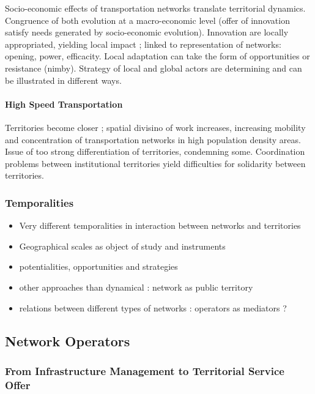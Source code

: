 Socio-economic effects of transportation networks translate territorial dynamics. Congruence of both evolution at a macro-economic level (offer of innovation satisfy needs generated by socio-economic evolution). Innovation are locally appropriated, yielding local impact ; linked to representation of networks: opening, power, efficacity. Local adaptation can take the form of opportunities or resistance (nimby). Strategy of local and global actors are determining and can be illustrated in different ways.

\paragraph{High Speed Transportation}

Territories become closer ; spatial divisino of work increases, increasing mobility and concentration of transportation networks in high population density areas. Issue of too strong differentiation of territories, condemning some. Coordination problems between institutional territories yield difficulties for solidarity between territories.


\subsubsection*{Temporalities}

\begin{itemize}
\item Very different temporalities in interaction between networks and territories
\item Geographical scales as object of study and instruments
\item potentialities, opportunities and strategies
\item other approaches than dynamical : network as public territory
\item relations between different types of networks : operators as mediators ?
\end{itemize}



\subsection{Network Operators}

\subsubsection*{From Infrastructure Management to Territorial Service Offer}


